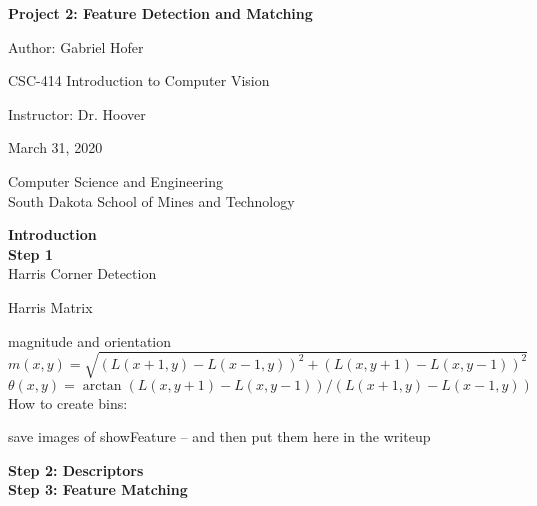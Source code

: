 \documentclass[12pt]{article}
\begin{document}
\begin{titlepage}
   \begin{center}
       \vspace*{1cm}
       \large
       \textbf{Project 2: Feature Detection and Matching}
       \normalsize

       \vspace{0.5cm}

       Author: Gabriel Hofer

       \vspace{0.5cm}

       CSC-414 Introduction to Computer Vision

       \vspace{0.5cm}

       Instructor: Dr. Hoover

       \vspace{0.5cm}

        March 31, 2020

       \vfill

       Computer Science and Engineering\\
       South Dakota School of Mines and Technology\\
   \end{center}
\end{titlepage}
\newpage



\small
\textbf{Introduction}\\ 



\textbf{Step 1}\\ 
Harris Corner Detection



Harris Matrix



magnitude and orientation
\[
    m(x,y) = \sqrt{(L(x+1,y)-L(x-1,y))^2+(L(x,y+1)-L(x,y-1))^2}
\]
\[
    \theta (x,y) = \arctan{(L(x,y+1)-L(x,y-1))/(L(x+1,y)-L(x-1,y))}
\]
How to create bins:

save images of showFeature -- and then put them here in the writeup

\textbf{Step 2: Descriptors}\\

\textbf{Step 3: Feature Matching}\\
\end{document}
